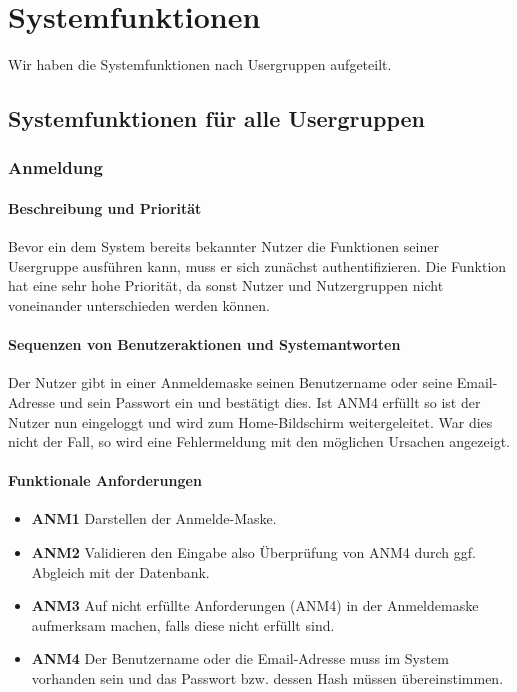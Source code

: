 \section{Systemfunktionen}
\label{system_features}

Wir haben die Systemfunktionen nach Usergruppen aufgeteilt.

\subsection{Systemfunktionen für alle Usergruppen}
\subsubsection{Anmeldung}
\paragraph{Beschreibung und Priorität}

Bevor ein dem System bereits bekannter Nutzer die Funktionen seiner Usergruppe ausführen kann, muss er sich zunächst authentifizieren. Die Funktion hat eine sehr hohe Priorität, da sonst Nutzer und Nutzergruppen nicht voneinander unterschieden werden können.

\paragraph{Sequenzen von Benutzeraktionen und Systemantworten}

Der Nutzer gibt in einer Anmeldemaske seinen Benutzername oder seine Email-Adresse und sein Passwort ein und bestätigt dies. Ist ANM4 erfüllt so ist der Nutzer nun eingeloggt und wird zum Home-Bildschirm weitergeleitet. War dies nicht der Fall, so wird eine Fehlermeldung mit den möglichen Ursachen angezeigt.

\paragraph{Funktionale Anforderungen} %
\begin{itemize}
	\item \textbf{ANM1} Darstellen der Anmelde-Maske.
	\item \textbf{ANM2} Validieren den Eingabe also Überprüfung von ANM4 durch ggf. Abgleich mit der Datenbank.
	\item \textbf{ANM3} Auf nicht erfüllte Anforderungen (ANM4) in der Anmeldemaske aufmerksam machen, falls diese nicht erfüllt sind.
	\item \textbf{ANM4} Der Benutzername oder die Email-Adresse muss im System vorhanden sein und das Passwort bzw. dessen Hash müssen übereinstimmen.
\end{itemize}

